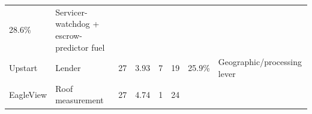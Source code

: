 \documentclass[
  10pt,
]{article}
\begin{document}
\begin{longtable}[]{@{}llllllll@{}}
\begin{minipage}[t]{0.10\columnwidth}
28.6\%\strut
\end{minipage} & \begin{minipage}[t]{0.10\columnwidth}\raggedright
Servicer-watchdog + escrow-predictor fuel\strut
\end{minipage}\tabularnewline
\begin{minipage}[t]{0.10\columnwidth}\raggedright
Upstart\strut
\end{minipage} & \begin{minipage}[t]{0.10\columnwidth}\raggedright
Lender\strut
\end{minipage} & \begin{minipage}[t]{0.10\columnwidth}\raggedright
27\strut
\end{minipage} & \begin{minipage}[t]{0.10\columnwidth}\raggedright
3.93\strut
\end{minipage} & \begin{minipage}[t]{0.10\columnwidth}\raggedright
7\strut
\end{minipage} & \begin{minipage}[t]{0.10\columnwidth}\raggedright
19\strut
\end{minipage} & \begin{minipage}[t]{0.10\columnwidth}\raggedright
25.9\%\strut
\end{minipage} & \begin{minipage}[t]{0.10\columnwidth}\raggedright
Geographic/processing lever\strut
\end{minipage}\tabularnewline
\begin{minipage}[t]{0.10\columnwidth}\raggedright
EagleView\strut
\end{minipage} & \begin{minipage}[t]{0.10\columnwidth}\raggedright
Roof measurement\strut
\end{minipage} & \begin{minipage}[t]{0.10\columnwidth}\raggedright
27\strut
\end{minipage} & \begin{minipage}[t]{0.10\columnwidth}\raggedright
4.74\strut
\end{minipage} & \begin{minipage}[t]{0.10\columnwidth}\raggedright
1\strut
\end{minipage} & \begin{minipage}[t]{0.10\columnwidth}\raggedright
24\strut
\end{minipage} & \begin{minipage}[t]{0.10\columnwidth}\raggedright

\end{minipage}
\end{longtable}
\end{document}
